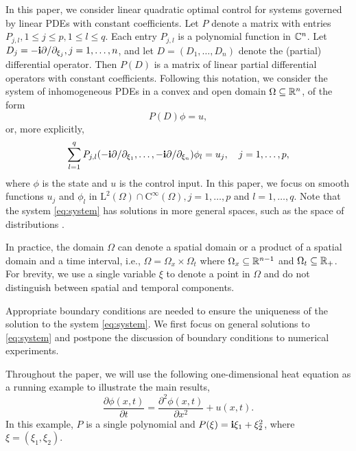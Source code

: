\documentclass[letterpaper, 10 pt, conference]{ieeeconf}  %
\begin{document}
In this paper, we consider linear quadratic optimal control for systems governed by linear PDEs with constant coefficients.
Let $P$ denote a matrix with entries $P_{j,l}, 1\leq j\leq p, 1\leq l\leq q$.
Each entry $P_{j,l}$ is a polynomial function in $\mathbb{C}^n$. 
Let $D_j = -\mathbf{i} \partial/\partial_{\xi_j}, j= 1, \ldots, n$, and let $D = (D_1, \ldots, D_n)$ denote the (partial) differential operator. 
Then $P(D)$ is a matrix of linear partial differential operators with constant coefficients.
Following this notation, we consider the system of inhomogeneous PDEs in a convex and open domain $\Omega\subseteq \mathbb{R}^n$, of the form
\begin{equation}\label{eq:system}
P(D) \phi = u,  
\end{equation}
or, more explicitly,
\begin{equation}\label{eq:system-explicit}
\sum_{l=1}^q P_{j,l}(-\mathbf{i} \partial/\partial_{\xi_1}, \ldots, -\mathbf{i} \partial/\partial_{\xi_n}) \phi_l = u_j, \quad j=1, \ldots, p,
\end{equation} 
where $\phi$ is the state and $u$ is the control input.
In this paper, we focus on smooth functions $u_j$ and $\phi_l$ in $\text{L}^2(\Omega)\cap \text{C}^\infty(\Omega), j=1,\ldots,p$ and $l=1,\ldots,q$.
Note that the system \eqref{eq:system} has solutions in more general spaces, such as the space of distributions \cite{treves2012ehrenpreis}.
\begin{remark}
   In practice, the domain $\Omega$ can denote a spatial domain or a product of a spatial domain and a time interval, i.e., $\Omega = \Omega_x \times \Omega_t$ where $\Omega_x \subseteq \mathbb{R}^{n-1}$ and $\Omega_t \subseteq \mathbb{R}_+$.
   For brevity, we use a single variable $\xi$ to denote a point in $\Omega$ and do not distinguish between spatial and temporal components.
\end{remark}
\begin{remark}
   Appropriate boundary conditions are needed to ensure the uniqueness of the solution to the system \eqref{eq:system}.
   We first focus on general solutions to \eqref{eq:system} and postpone the discussion of boundary conditions to numerical experiments.
\end{remark}
\begin{example}
   Throughout the paper, we will use the following one-dimensional heat equation as a running example to illustrate the main results,
   \begin{equation}\label{eq:heat-equation}
      \frac{\partial \phi(x,t)}{\partial t} = \frac{\partial^2 \phi(x,t)}{\partial x^2} + u(x,t).
   \end{equation}
   In this example, $P$ is a single polynomial and $P(\xi) = \mathbf{i} \xi_1 + \xi_2^2$, where $\xi = (\xi_1, \xi_2)$.
\end{example}
\end{document}
